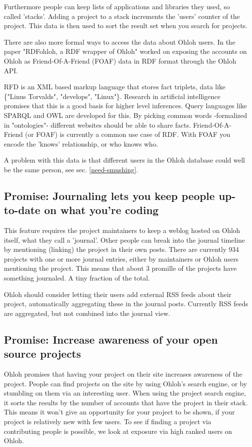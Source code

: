 \documentclass{sig-alternate}
\begin{document}
Furthermore people can keep lists of applications and libraries they used, so called 'stacks'. Adding a project to a stack increments the 'users' counter of the project. This data is then used to sort the result set when you search for projects. 

There are also more formal ways to access the data about Ohloh users. In the paper "RDFohloh, a RDF wrapper of Ohloh" \cite{Fernandez:2008p4488}  worked on exposing the accounts on Ohloh as Friend-Of-A-Friend (FOAF) data in RDF format through the Ohloh API.

RFD is an XML based markup language that stores fact triplets, data like \{"Linus Torvalds", "develops", "Linux"\}. Research in artificial intelligence promises that this is a good basis for higher level inferences. Query languages like SPARQL and OWL are developed for this. By picking common words -formalized in "ontologies"- different websites should be able to share facts. Friend-Of-A-Friend (or FOAF) is currently a common use case of RDF. With FOAF you encode the 'knows' relationship, or who knows who.

A problem with this data is that different users in the Ohloh database could well be the same person, see sec. \ref{need-smushing}.

\subsection{Promise: Journaling lets you keep people up-to-date on what you're coding}

This feature requires the project maintainers to keep a weblog hosted on Ohloh itself, what they call a 'journal'. Other people can break into the journal timeline by mentioning (linking) the project in their own posts. There are currently 934 projects with one or more journal entries, either by maintainers or Ohloh users mentioning the project. This means that about 3 promille of the projects have something journaled. A tiny fraction of the total.

Ohloh should consider letting their users add external RSS feeds about their project, automatically aggregating these in the journal posts. Currently RSS feeds are aggregated, but not combined into the journal view.


\subsection{Promise: Increase awareness of your open source projects}
Ohloh promises that having your project on their site increases awareness of the project. People can find projects on the site by using Ohloh's search engine, or by stumbling on them via an interesting user. When using the project search engine, it sorts the results by the number of accounts that have the project in their stack. This means it won't give an opportunity for your project to be shown, if your project is relatively new with few users. To see if finding a project via contributing people is possible, we look at exposure via high ranked users on Ohloh.
\end{document}
